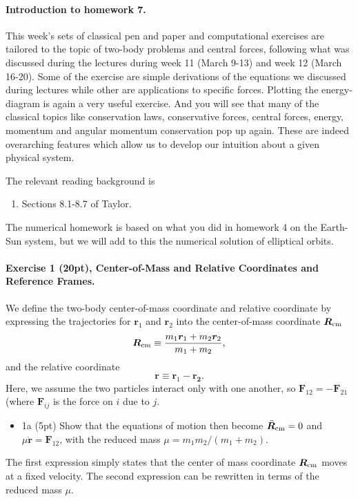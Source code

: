 \documentclass[%
oneside,                 %
final,                   %
10pt]{article}
\begin{document}
\noindent
\paragraph{Introduction to homework 7.}
This week's sets of classical pen and paper and computational
exercises are tailored to the topic of two-body problems and central
forces, following what was discussed during the lectures during week
11 (March 9-13) and week 12 (March 16-20). Some of the exercise are
simple derivations of the equations we discussed during lectures while
other are applications to specific forces. Plotting the energy-diagram
is again a very useful exercise. And you will see that many of the
classical topics like conservation laws, conservative forces, central
forces, energy, momentum and angular momentum conservation pop up
again. These are indeed overarching features which allow us to develop
our intuition about a given physical system.

The relevant reading background is
\begin{enumerate}
\item Sections 8.1-8.7 of Taylor.
\end{enumerate}

\noindent
The numerical homework is based on what you did in homework 4 on the Earth-Sun system, but we will add to this the numerical solution of elliptical orbits. 


\paragraph{Exercise 1 (20pt), Center-of-Mass and Relative Coordinates and Reference Frames.}
We define the two-body center-of-mass coordinate and relative coordinate by expressing the trajectories for
$\bm{r}_1$ and $\bm{r}_2$ into the center-of-mass coordinate
$\bm{R}_{\rm cm}$ 
\[
\bm{R}_{\rm cm}\equiv\frac{m_1\bm{r}_1+m_2\bm{r}_2}{m_1+m_2},
\]
and the relative coordinate 
\[
\bm{r}\equiv\bm{r}_1-\bm{r_2}.
\]
Here, we assume the two particles interact only with one another, so $\bm{F}_{12}=-\bm{F}_{21}$ (where $\bm{F}_{ij}$ is the force on $i$ due to $j$.

\begin{itemize}
\item 1a (5pt) Show that the equations of motion then become $\ddot{\bm{R}}_{\rm cm}=0$ and $\mu\ddot{\bm{r}}=\bm{F}_{12}$, with the reduced mass $\mu=m_1m_2/(m_1+m_2)$.
\end{itemize}

\noindent
The first expression simply states that the center of mass coordinate $\bm{R}_{\rm cm}$ moves at a fixed velocity. The second expression can be rewritten in terms of the reduced mass $\mu$.
\end{document}
